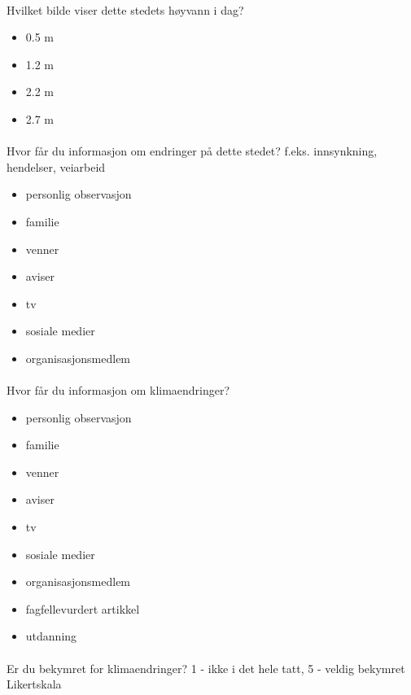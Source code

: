 \paragraph{}
Hvilket bilde viser dette stedets høyvann i dag?
\begin{itemize}
    \item 0.5 m
    \item 1.2 m
    \item 2.2 m
    \item 2.7 m
\end{itemize}
\paragraph{}

Hvor får du informasjon om endringer på dette stedet?
f.eks. innsynkning, hendelser, veiarbeid
\begin{itemize}
    \item personlig observasjon
    \item familie
    \item venner
    \item aviser
    \item tv
    \item sosiale medier
    \item organisasjonsmedlem
\end{itemize}
\paragraph{}

Hvor får du informasjon om klimaendringer?
\begin{itemize}
    \item personlig observasjon
    \item familie
    \item venner
    \item aviser
    \item tv
    \item sosiale medier
    \item organisasjonsmedlem
    \item fagfellevurdert artikkel
    \item utdanning
\end{itemize}
\paragraph{}

Er du bekymret for klimaendringer?
1 - ikke i det hele tatt, 5 - veldig bekymret
Likertskala
